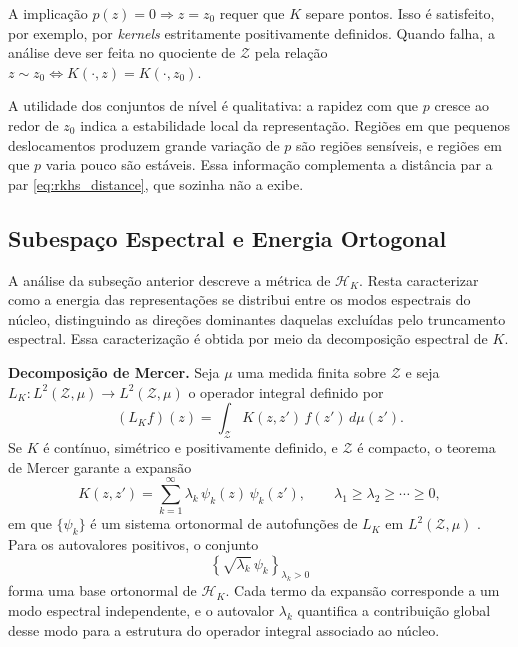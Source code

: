 \begin{remark}\label{rem:point_sep}
A implicação $p(z) = 0 \Rightarrow z = z_0$ requer que $K$ separe pontos. Isso é satisfeito, por exemplo, por \textit{kernels} estritamente positivamente definidos. Quando falha, a análise deve ser feita no quociente de $\mathcal{Z}$ pela relação $z \sim z_0 \iff K(\cdot, z) = K(\cdot, z_0)$.
\end{remark}
 
A utilidade dos conjuntos de nível é qualitativa: a rapidez com que $p$ cresce ao redor de $z_0$ indica a estabilidade local da representação. Regiões em que pequenos deslocamentos produzem grande variação de $p$ são regiões sensíveis, e regiões em que $p$ varia pouco são estáveis. Essa informação complementa a distância par a par \eqref{eq:rkhs_distance}, que sozinha não a exibe.
 
\subsection{Subespaço Espectral e Energia Ortogonal}\label{subsec:spectral}
 
A análise da subseção anterior descreve a métrica de $\mathcal{H}_K$. Resta caracterizar como a energia das representações se distribui entre os modos espectrais do núcleo, distinguindo as direções dominantes daquelas excluídas pelo truncamento espectral. Essa caracterização é obtida por meio da decomposição espectral de $K$.
 
\textbf{Decomposição de Mercer.} Seja $\mu$ uma medida finita sobre $\mathcal{Z}$ e seja $L_K : L^2(\mathcal{Z},\mu) \to L^2(\mathcal{Z},\mu)$ o operador integral definido por
\begin{equation}\label{eq:integral_operator}
    (L_K f)(z)
    =
    \int_{\mathcal{Z}}
    K(z,z')\,f(z')\,d\mu(z').
\end{equation}
Se $K$ é contínuo, simétrico e positivamente definido, e $\mathcal{Z}$ é compacto, o teorema de Mercer garante a expansão
\begin{equation}\label{eq:mercer}
    K(z,z')
    =
    \sum_{k=1}^{\infty}
    \lambda_k\,\psi_k(z)\,\psi_k(z'),
    \qquad
    \lambda_1 \geq \lambda_2 \geq \cdots \geq 0,
\end{equation}
em que $\{\psi_k\}$ é um sistema ortonormal de autofunções de $L_K$ em $L^2(\mathcal{Z},\mu)$ \citep{Mercer1909, Aronszajn1950}. Para os autovalores positivos, o conjunto
\begin{equation*}
    \left\{
        \sqrt{\lambda_k}\,\psi_k
    \right\}_{\lambda_k>0}
\end{equation*}
forma uma base ortonormal de $\mathcal{H}_K$. Cada termo da expansão corresponde a um modo espectral independente, e o autovalor $\lambda_k$ quantifica a contribuição global desse modo para a estrutura do operador integral associado ao núcleo.

